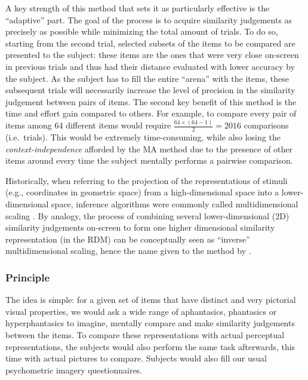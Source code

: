 \documentclass[
  authoryear]{elsarticle}
\begin{document}
A key strength of this method that sets it as particularly effective is
the ``adaptive'' part. The goal of the process is to acquire similarity
judgements as precisely as possible while minimizing the total amount of
trials. To do so, starting from the second trial, selected subsets of
the items to be compared are presented to the subject: these items are
the ones that were very close on-screen in previous trials and thus had
their distance evaluated with lower accuracy by the subject. As the
subject has to fill the entire ``arena'' with the items, these
subsequent trials will necessarily increase the level of precision in
the similarity judgement between pairs of items. The second key benefit
of this method is the time and effort gain compared to others. For
example, to compare every pair of items among 64 different items would
require \(\frac{64 \times (64-1)}{2} = 2016\) comparisons (i.e.~trials).
This would be extremely time-consuming, while also losing the
\emph{context-independence} afforded by the MA method due to the
presence of other items around every time the subject mentally performs
a pairwise comparison.

Historically, when referring to the projection of the representations of
stimuli (e.g., coordinates in geometric space) from a high-dimensional
space into a lower-dimensional space, inference algorithms were commonly
called multidimensional scaling \citep{roads2024}. By analogy, the
process of combining several lower-dimensional (2D) similarity
judgements on-screen to form one higher dimensional similarity
representation (in the RDM) can be conceptually seen as ``inverse''
multidimensional scaling, hence the name given to the method by
\citet{kriegeskorteInverseMDSInferring2012}.

\subsubsection{Principle}\label{sec-principle}

The idea is simple: for a given set of items that have distinct and very
pictorial visual properties, we would ask a wide range of aphantasics,
phantasics or hyperphantasics to imagine, mentally compare and make
similarity judgements between the items. To compare these
representations with actual perceptual representations, the subjects
would also perform the same task afterwards, this time with actual
pictures to compare. Subjects would also fill our usual psychometric
imagery questionnaires.
\end{document}
